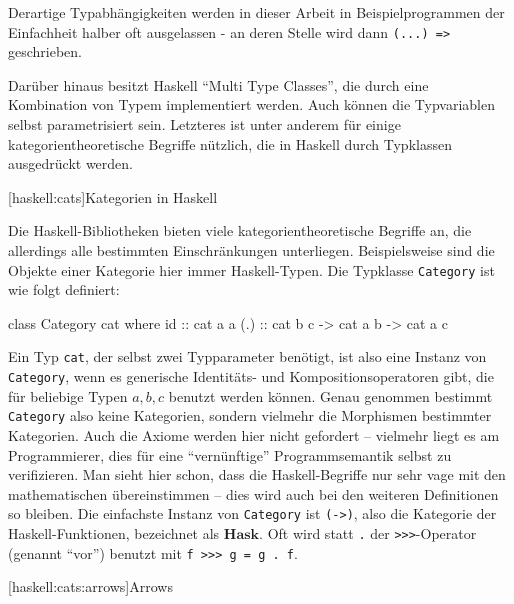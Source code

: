 \documentclass[12pt, a4paper, bibgerm]{scrbook}
\newenvironment{DIFnomarkup}{}{}
\newcommand\icode[1]{\lstinline?#1?}
\newcommand\lsection{}
\newcommand\lsubsection{}
\begin{document}
Derartige Typabhängigkeiten werden in dieser Arbeit in
Beispielprogrammen der Einfachheit halber oft ausgelassen - an deren
Stelle wird dann \icode{(...) =>} geschrieben.

Darüber hinaus besitzt Haskell ``Multi Type Classes'', die durch eine
Kombination von Typem implementiert werden. Auch können die Typvariablen
selbst parametrisiert sein. Letzteres ist unter anderem für einige
kategorientheoretische Begriffe nützlich, die in Haskell durch
Typklassen ausgedrückt werden.

\lsection[haskell:cats]{Kategorien in Haskell}

Die Haskell-Bibliotheken bieten viele kategorientheoretische Begriffe an,
die allerdings alle bestimmten Einschränkungen
unterliegen. Beispielsweise sind die Objekte einer Kategorie hier immer
Haskell-Typen. Die Typklasse \icode{Category} ist wie folgt definiert:
\begin{DIFnomarkup}\begin{code}
class Category cat where
  id   :: cat a a
  (.)  :: cat b c -> cat a b -> cat a c
\end{code}\end{DIFnomarkup}
Ein Typ \icode{cat}, der selbst zwei Typparameter benötigt, ist also eine
Instanz von \icode{Category}, wenn es generische Identitäts- und
Kompositionsoperatoren gibt, die für beliebige Typen $a,b,c$ benutzt
werden können. Genau genommen bestimmt \icode{Category} also keine
Kategorien, sondern vielmehr die Morphismen bestimmter Kategorien. Auch
die Axiome werden hier nicht gefordert -- vielmehr liegt es am
Programmierer, dies für eine "`vernünftige"' Programmsemantik selbst zu
verifizieren. Man sieht hier schon, dass die Haskell-Begriffe nur sehr
vage mit den mathematischen übereinstimmen -- dies wird auch bei den
weiteren Definitionen so bleiben. Die einfachste Instanz von
\icode{Category} ist \icode{(->)}, also die Kategorie der
Haskell-Funktionen, bezeichnet als $\mathbf{Hask}$.
Oft wird statt \icode{.} der \icode{>>>}-Operator (genannt "`vor"') %
benutzt mit \icode{f >>> g = g . f}. %

\lsubsection[haskell:cats:arrows]{Arrows}
\end{document}
